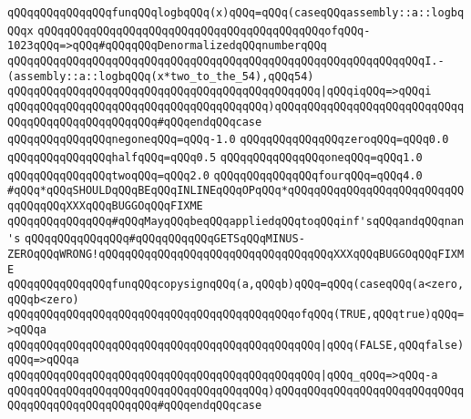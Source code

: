 \verb|qQQqqQQqqQQqqQQqfunqQQqlogbqQQq(x)qQQq=qQQq(caseqQQqassembly::a::logbqQQqx|\newline
\verb|qQQqqQQqqQQqqQQqqQQqqQQqqQQqqQQqqQQqqQQqqQQqofqQQq-1023qQQq=>qQQq#qQQqqQQqDenormalizedqQQqnumberqQQq|\newline
\verb|qQQqqQQqqQQqqQQqqQQqqQQqqQQqqQQqqQQqqQQqqQQqqQQqqQQqqQQqqQQqqQQqI.-(assembly::a::logbqQQq(x*two_to_the_54),qQQq54)|\newline
\verb|qQQqqQQqqQQqqQQqqQQqqQQqqQQqqQQqqQQqqQQqqQQqqQQq|\verb#|qQQqiqQQq=>qQQqi#\newline
\verb|qQQqqQQqqQQqqQQqqQQqqQQqqQQqqQQqqQQqqQQq)qQQqqQQqqQQqqQQqqQQqqQQqqQQqqQQqqQQqqQQqqQQqqQQqqQQq#qQQqendqQQqcase|\newline
\newline
\verb|qQQqqQQqqQQqqQQqnegoneqQQq=qQQq-1.0|\newline
\verb|qQQqqQQqqQQqqQQqzeroqQQq=qQQq0.0|\newline
\verb|qQQqqQQqqQQqqQQqhalfqQQq=qQQq0.5|\newline
\verb|qQQqqQQqqQQqqQQqoneqQQq=qQQq1.0|\newline
\verb|qQQqqQQqqQQqqQQqtwoqQQq=qQQq2.0|\newline
\verb|qQQqqQQqqQQqqQQqfourqQQq=qQQq4.0|\newline
\newline
\verb|#qQQq*qQQqSHOULDqQQqBEqQQqINLINEqQQqOPqQQq*qQQqqQQqqQQqqQQqqQQqqQQqqQQqqQQqqQQqXXXqQQqBUGGOqQQqFIXME|\newline
\newline
\verb|qQQqqQQqqQQqqQQq#qQQqMayqQQqbeqQQqappliedqQQqtoqQQqinf'sqQQqandqQQqnan's|\newline
\verb|qQQqqQQqqQQqqQQq#qQQqqQQqqQQqGETSqQQqMINUS-ZEROqQQqWRONG!qQQqqQQqqQQqqQQqqQQqqQQqqQQqqQQqqQQqXXXqQQqBUGGOqQQqFIXME|\newline
\newline
\verb|qQQqqQQqqQQqqQQqfunqQQqcopysignqQQq(a,qQQqb)qQQq=qQQq(caseqQQq(a<zero,qQQqb<zero)|\newline
\verb|qQQqqQQqqQQqqQQqqQQqqQQqqQQqqQQqqQQqqQQqqQQqofqQQq(TRUE,qQQqtrue)qQQq=>qQQqa|\newline
\verb|qQQqqQQqqQQqqQQqqQQqqQQqqQQqqQQqqQQqqQQqqQQqqQQq|\verb#|qQQq(FALSE,qQQqfalse)qQQq=>qQQqa#\newline
\verb|qQQqqQQqqQQqqQQqqQQqqQQqqQQqqQQqqQQqqQQqqQQqqQQq|\verb#|qQQq_qQQq=>qQQq-a#\newline
\verb|qQQqqQQqqQQqqQQqqQQqqQQqqQQqqQQqqQQqqQQq)qQQqqQQqqQQqqQQqqQQqqQQqqQQqqQQqqQQqqQQqqQQqqQQqqQQq#qQQqendqQQqcase|\newline

